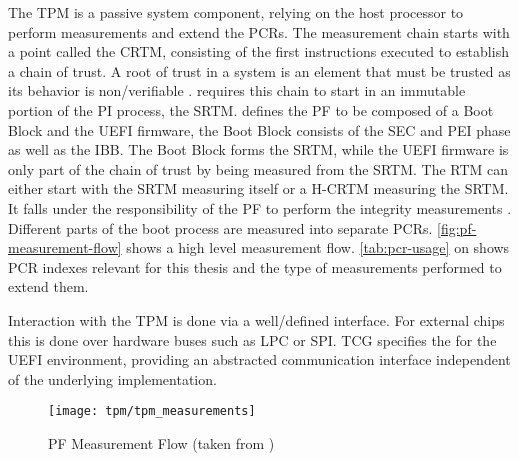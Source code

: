 The \ac{TPM} is a passive system component, relying on the host processor to perform measurements and extend the \acp{PCR}.
The measurement chain starts with a point called the \ac{CRTM}, consisting of the first instructions executed to establish a chain of trust.
A root of trust in a system is an element that must be trusted as its behavior is non\-/verifiable \cite{tcg-tpm-library-part1-architecture}.
\cite[3.2.2]{tcg-pc-client-platform-firmware-profile-spec} requires this chain to start in an immutable portion of the \ac{PI} process, the \ac{SRTM}.
\cite[3.2.3.1]{tcg-pc-client-platform-firmware-profile-spec} defines the \ac{PF} to be composed of a Boot Block and the \ac{UEFI} firmware, the Boot Block consists of the \ac{SEC} and \ac{PEI} phase as well as the \ac{IBB}.
The Boot Block forms the \ac{SRTM}, while the \ac{UEFI} firmware is only part of the chain of trust by being measured from the \ac{SRTM}.
The \ac{RTM} can either start with the \ac{SRTM} measuring itself or a \ac{H-CRTM} measuring the \ac{SRTM}.
It falls under the responsibility of the \ac{PF} to perform the integrity measurements \cite{tcg-pc-client-platform-firmware-profile-spec}.
Different parts of the boot process are measured into separate \acp{PCR}.
\autoref{fig:pf-measurement-flow} shows a high level measurement flow.
\autoref{tab:pcr-usage} on \pageref{tab:pcr-usage} shows \ac{PCR} indexes relevant for this thesis and the type of measurements performed to extend them.

Interaction with the \ac{TPM} is done via a well\-/defined interface.
For external chips this is done over hardware buses such as \ac{LPC} or \ac{SPI}.
\ac{TCG} specifies the  for the \ac{UEFI} environment, providing an abstracted communication interface independent of the underlying implementation.

\begin{figure}[htb]
    \centering
    \texttt{[image: tpm/tpm\_measurements]}
    \caption[\acs{PF} Measurement Flow]{\acs{PF} Measurement Flow (taken from \cite[Figure 3]{tianocore-trusted-boot-chain})}
    \label{fig:pf-measurement-flow}
\end{figure}

